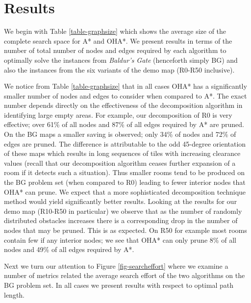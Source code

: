 \section{Results}
\label{sec-results}
We begin with Table \ref{table-graphsize} which shows the average size of the complete search
space for A* and OHA*.
We present results in terms of the number of total number of nodes and edges required by each algorithm
to optimally solve the instances from \emph{Baldur's Gate} (henceforth simply BG) and also 
the instances from the six variants of the demo map (R0-R50 inclusive).

We notice from Table \ref{table-graphsize} that in all cases OHA* has a significantly smaller number 
of nodes and edges to consider when compared to A*.
The exact number depends directly on the effectiveness of the decomposition algorithm in identifying 
large empty areas.
For example, our decomposition of R0 is very effective; over 61\% of all nodes and 87\% of all 
edges required by A* are pruned.
On the BG maps a smaller saving is observed; only 34\% of nodes and 72\% of edges are pruned.
The difference is attributable to the odd 45-degree orientation of these maps which results in 
long sequences of tiles with increasing clearance values 
(recall that our decomposition algorithm ceases further expansion of a room if it detects 
such a situation).
Thus smaller rooms tend to be produced on the BG problem set (when compared to R0) leading to 
fewer interior nodes that OHA* can prune. 
We expect that a more sophisticated decomposition technique method would yield significantly 
better results.
Looking at the results for our demo map (R10-R50 in particular) we observe that as the number of 
randomly distributed obstacles increases there is a corresponding drop in the number of nodes that may be 
pruned.
This is as expected. 
On R50 for example most rooms contain few if any interior nodes; 
we see that OHA* can only prune 8\% of all nodes and 49\% of all edges required by A*.
\par
Next we turn our attention to Figure \ref{fig-searcheffort} where we examine a number of metrics
related the average search effort of the two algorithms on the BG problem set.
In all cases we present results with respect to optimal path length.
